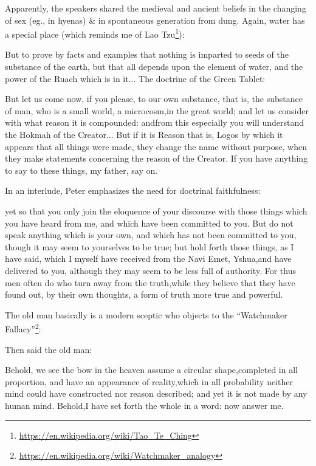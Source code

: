 Apparently, the speakers shared the medieval and ancient beliefs in the changing of sex (eg., in hyenas) \& in spontaneous generation from dung. Again, water has a special place (which reminds me of Lao Tzu\footnote{\url{https://en.wikipedia.org/wiki/Tao\_Te\_Ching}}):

But to prove by facts and examples that nothing is imparted to seeds of the substance of the earth, but that all depends upon the element of water, and the power of the Ruach which is in it... The doctrine of the Green Tablet:

\begin{quotex}
But let us come now, if you please, to our own substance, that is, the substance of man, who is a small world, a microcosm,in the great world; and let us consider with what reason it is compounded: andfrom this especially you will understand the Hokmah of the Creator... But if it is Reason that is, Logos by which it appears that all things were made, they change the name without purpose, when they make statements concerning the reason of the Creator. If you have anything to say to these things, my father, say on.
\end{quotex}


In an interlude, Peter emphasizes the need for doctrinal faithfulness:

\begin{quotex}
yet so that you only join the eloquence of your discourse with those things which you have heard from me, and which have been committed to you. But do not speak anything which is your own, and which has not been committed to you, though it may seem to yourselves to be true; but hold forth those things, as I have said, which I myself have received from the Navi Emet, Yshua,and have delivered to you, although they may seem to be less full of authority. For thus men often do who turn away from the truth,while they believe that they have found out, by their own thoughts, a form of truth more true and powerful.
\end{quotex}


The old man basically is a modern sceptic who objects to the ``Watchmaker Fallacy''\footnote{\url{https://en.wikipedia.org/wiki/Watchmaker\_analogy}}:

Then said the old man:

\begin{quotex}
Behold, we see the bow in the heaven assume a circular shape,completed in all proportion, and have an appearance of reality,which in all probability neither mind could have constructed nor reason described; and yet it is not made by any human mind. Behold,I have set forth the whole in a word: now answer me.
\end{quotex}



